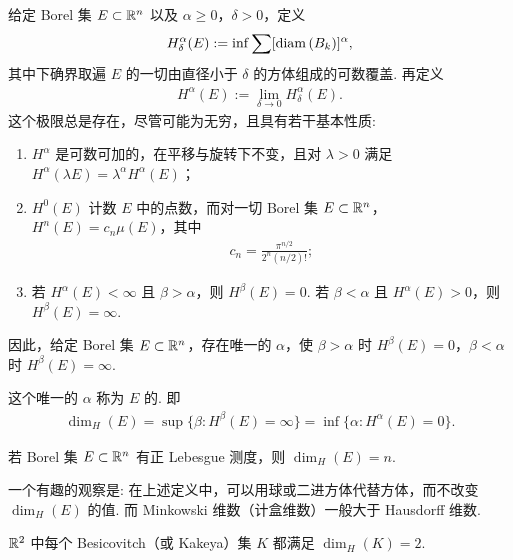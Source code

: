 给定 Borel 集 $E \subset \mathbb{R}^n$ 以及 $\alpha \geq 0$，$\delta > 0$，定义
\begin{align*}
  H_{\delta}^{\alpha}(E):=\inf\sum[\operatorname{diam}\left(B_{k}\right)]^{\alpha},
\end{align*}
其中下确界取遍 $E$ 的一切由直径小于 $\delta$ 的方体组成的可数覆盖. 再定义
\begin{align*}
  H^{\alpha}(E):=\lim_{\delta\rightarrow 0}H^{\alpha}_{\delta}(E).
\end{align*}
这个极限总是存在，尽管可能为无穷，且具有若干基本性质:
\begin{enumerate}
\item[(1)] $H^\alpha$ 是可数可加的，在平移与旋转下不变，且对 $\lambda > 0$ 满足 $H^\alpha(\lambda E) = \lambda^\alpha H^\alpha(E)$；
\item[(2)] $H^0(E)$ 计数 $E$ 中的点数，而对一切 Borel 集 $E \subset \mathbb{R}^n$，$H^n(E) = c_n \mu(E)$，其中
\begin{align*}
  c_{n}=\frac{\pi^{n/2}}{2^{n}\left(n/2\right)!};
\end{align*}
\item[(3)] 若 $H^{\alpha}(E) < \infty$ 且 $\beta > \alpha$，则 $H^{\beta}(E) = 0$. 若 $\beta < \alpha$ 且 $H^{\alpha}(E) > 0$，则 $H^{\beta}(E) = \infty$.
\end{enumerate}
因此，给定 Borel 集 $E \subset \mathbb{R}^n$，存在唯一的 $\alpha$，使 $\beta > \alpha$ 时 $H^\beta(E) = 0$，$\beta < \alpha$ 时 $H^\beta(E) = \infty$.

\begin{definition}\label{def:3.11}
这个唯一的 $\alpha$ 称为 $E$ 的. 即
\begin{align*}
  \dim_{H}(E)=\sup\{\beta:H^{\beta}(E)=\infty\}=\inf\{\alpha:H^{\alpha}(E)=0\}.
\end{align*}
\end{definition}

若 Borel 集 $E \subset \mathbb{R}^n$ 有正 Lebesgue 测度，则 $\dim_H(E) = n$.

一个有趣的观察是: 在上述定义中，可以用球或二进方体代替方体，而不改变 $\dim_{H}(E)$ 的值. 而 Minkowski 维数（计盒维数）一般大于 Hausdorff 维数.

\begin{theorem}\label{thm:3.12}
$\mathbb{R}^2$ 中每个 Besicovitch（或 Kakeya）集 $K$ 都满足 $\dim_H(K) = 2$.
\end{theorem}

